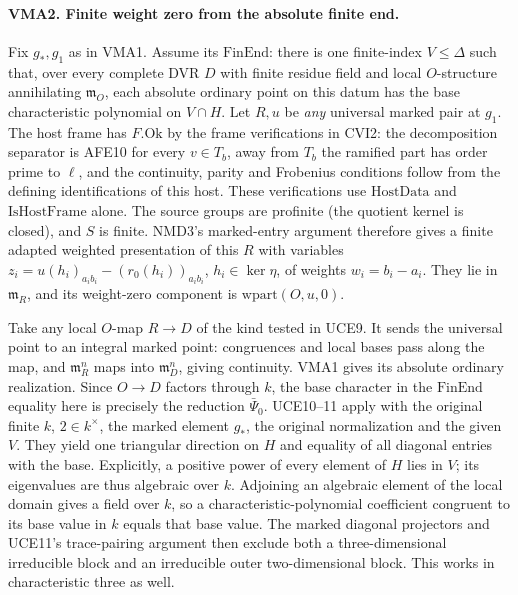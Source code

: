 \paragraph{VMA2. Finite weight zero from the absolute finite end.}
\label{claim:VMA2}
Fix $g_*,g_1$ as in VMA1. Assume its $\mathrm{FinEnd}$: there is
one finite-index $V\le\Delta$ such that, over every complete DVR
$D$ with finite residue field and local $O$-structure annihilating
$\mathfrak m_O$, each absolute ordinary point on this datum has
the base characteristic polynomial on $V\cap H$. Let $R,u$ be
\emph{any} universal marked pair at $g_1$.
The host frame has $F.\mathrm{Ok}$ by the frame verifications in
CVI2: the decomposition separator is AFE10 for every $v\in T_b$,
away from $T_b$ the ramified part has order prime to $\ell$, and
the continuity, parity and Frobenius conditions follow from the
defining identifications of this host. These verifications use
$\mathrm{HostData}$ and $\mathrm{IsHostFrame}$ alone. The source
groups are profinite (the quotient kernel is closed), and $S$ is
finite. NMD3's marked-entry argument therefore gives a finite
adapted weighted presentation of this $R$ with variables
$z_i=u(h_i)_{a_i b_i}-(r_0(h_i))_{a_i b_i}$, $h_i\in\ker\eta$,
of weights $w_i=b_i-a_i$. They lie in $\mathfrak m_R$, and its
weight-zero component is $\mathrm{wpart}(O,u,0)$.

Take any local $O$-map $R\to D$ of the kind tested in UCE9.
It sends the universal point to an integral marked point:
congruences and local bases pass along the map, and
$\mathfrak m_R^n$ maps into $\mathfrak m_D^n$, giving continuity.
VMA1 gives its absolute ordinary realization. Since
$O\to D$ factors through $k$, the base character in the
$\mathrm{FinEnd}$ equality here is precisely the reduction
$\bar\Psi_0$. UCE10--11 apply with the original finite $k$,
$2\in k^\times$, the marked element $g_*$, the original normalization
and the given $V$. They yield one triangular direction on $H$ and
equality of all diagonal entries with the base. Explicitly, a positive
power of every element of $H$ lies in $V$; its eigenvalues are thus
algebraic over $k$. Adjoining an algebraic element of the local domain
gives a field over $k$, so a characteristic-polynomial coefficient
congruent to its base value in $k$ equals that base value. The marked
diagonal projectors and UCE11's trace-pairing argument then exclude
both a three-dimensional irreducible block and an irreducible outer
two-dimensional block. This works in characteristic three as well.

